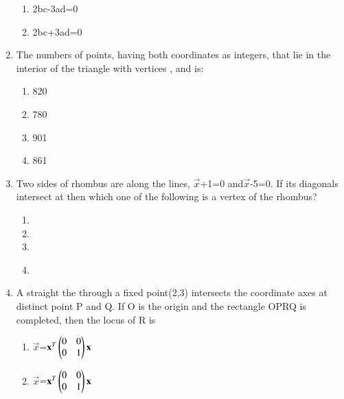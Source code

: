 \begin{enumerate}
\begin{enumerate}
     \item  2bc-3ad=0
     \item  2bc+3ad=0\\
     \end{enumerate}
    \item The numbers of points, having both coordinates as integers, that lie in the interior of the triangle with vertices , and is:\\
    \begin{enumerate}
     \item  820 
     \item  780
     \item  901
     \item  861\\
     \end{enumerate}
    \item Two sides of rhombus are along the lines, $\vec {x}$+1=0 and$\vec {x}$-5=0. If its diagonals intersect at then which one of the following is a vertex of the rhombus?\\
    \begin{enumerate}
     \item  {}
     \item  {}
     \item  {}
     \item  {}\\
     \end{enumerate}
    \item A straight the through a fixed point(2,3) intersects the coordinate axes at distinct point P and Q. If O is the origin and the rectangle OPRQ is completed, then the locus of R is\\
    \begin{enumerate}
     \item  {} $\vec {x}$=$\mathbf {x}^T \begin{pmatrix} 0 & 0  \\0 & 1\end{pmatrix}\mathbf {x}$
     \item  {} $\vec {x}$=$\mathbf {x}^T\begin{pmatrix} 0 & 0  \\0 & 1\end{pmatrix}\mathbf {x}$

\end{enumerate}
\end{enumerate}
